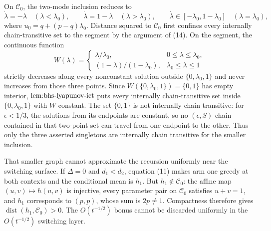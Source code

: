On \(\mathcal C_0\), the two-mode inclusion reduces to
\[
 \dot\lambda=-\lambda\quad(\lambda<\lambda_0),\qquad
 \dot\lambda=1-\lambda\quad(\lambda>\lambda_0),\qquad
 \dot\lambda\in[-\lambda_0,1-\lambda_0]\quad(\lambda=\lambda_0), \tag{17}
\]
where \(u_0=q+(p-q)\lambda_0\).  Distance squared to \(\mathcal C_0\) first confines every internally chain-transitive set to the segment by the argument of (14).  On the segment, the continuous function
\[
 W(\lambda)=
 \begin{cases}
 \lambda/\lambda_0,&0\leq\lambda\leq\lambda_0,\\
 (1-\lambda)/(1-\lambda_0),&\lambda_0\leq\lambda\leq1
 \end{cases}
\]
strictly decreases along every nonconstant solution outside \(\{0,\lambda_0,1\}\) and never increases from those three points.  Since \(W(\{0,\lambda_0,1\})=\{0,1\}\) has empty interior, \(\textnormal{lem:bhs-lyapunov-ict}\) puts every internally chain-transitive set inside \(\{0,\lambda_0,1\}\) with \(W\) constant.  The set \(\{0,1\}\) is not internally chain transitive: for \(\epsilon<1/3\), the solutions from its endpoints are constant, so no \((\epsilon,S)\)-chain contained in that two-point set can travel from one endpoint to the other.  Thus only the three asserted singletons are internally chain transitive for the smaller inclusion.

That smaller graph cannot approximate the recursion uniformly near the switching surface.  If \(\Delta=0\) and \(d_1<d_2\), equation (11) makes arm one greedy at both contexts and the conditional mean is \(h_1\).  But \(h_1\notin\mathcal C_0\): the affine map \((u,v)\mapsto h(u,v)\) is injective, every parameter pair on \(\mathcal C_0\) satisfies \(u+v=1\), and \(h_1\) corresponds to \((p,p)\), whose sum is \(2p\neq1\).  Compactness therefore gives \(\operatorname{dist}(h_1,\mathcal C_0)>0\).  The \(O(t^{-1/2})\) bonus cannot be discarded uniformly in the \(O(t^{-1/2})\) switching layer.

